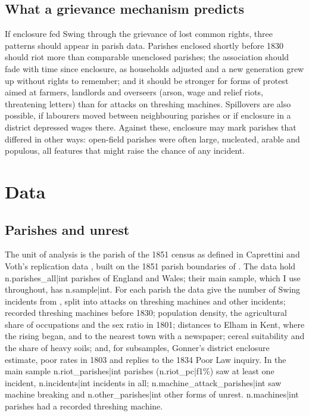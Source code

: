 \documentclass[11pt,a4paper]{article}
\begin{document}
\subsection{What a grievance mechanism predicts}
If enclosure fed Swing through the grievance of lost common rights, three patterns should appear in parish data. Parishes enclosed shortly before 1830 should riot more than comparable unenclosed parishes; the association should fade with time since enclosure, as households adjusted and a new generation grew up without rights to remember; and it should be stronger for forms of protest aimed at farmers, landlords and overseers (arson, wage and relief riots, threatening letters) than for attacks on threshing machines. Spillovers are also possible, if labourers moved between neighbouring parishes or if enclosure in a district depressed wages there. Against these, enclosure may mark parishes that differed in other ways: open-field parishes were often large, nucleated, arable and populous, all features that might raise the chance of any incident.

\section{Data}
\subsection{Parishes and unrest}
The unit of analysis is the parish of the 1851 census as defined in Caprettini and Voth's replication data \citep{caprettinivoth2020data}, built on the 1851 parish boundaries of \citet{satchell2016}. The data hold {{n.parishes_all|int}} parishes of England and Wales; their main sample, which I use throughout, has {{n.sample|int}}. For each parish the data give the number of Swing incidents from \citet{holland2005}, split into attacks on threshing machines and other incidents; recorded threshing machines before 1830; population density, the agricultural share of occupations and the sex ratio in 1801; distances to Elham in Kent, where the rising began, and to the nearest town with a newspaper; cereal suitability and the share of heavy soils; and, for subsamples, Gonner's district enclosure estimate, poor rates in 1803 and replies to the 1834 Poor Law inquiry. In the main sample {{n.riot_parishes|int}} parishes ({{n.riot_pc|f1}}\%) saw at least one incident, {{n.incidents|int}} incidents in all; {{n.machine_attack_parishes|int}} saw machine breaking and {{n.other_parishes|int}} other forms of unrest. {{n.machines|int}} parishes had a recorded threshing machine.
\end{document}
